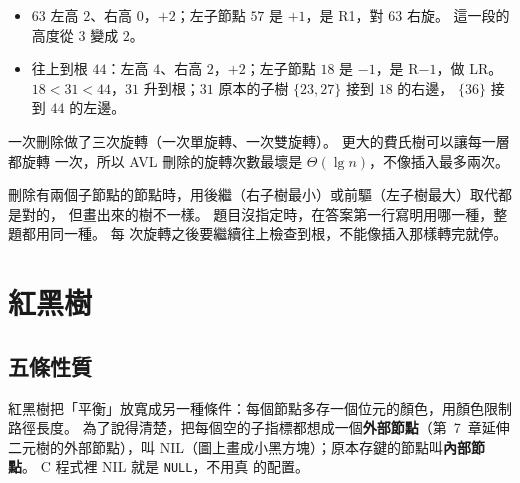 \begin{figure}[htbp]
\label{fig:bal-avl-cascade}
\end{figure}

\begin{itemize}
\item $63$ 左高 $2$、右高 $0$，$+2$；左子節點 $57$ 是 $+1$，是 R1，對 $63$ 右旋。
這一段的高度從 $3$ 變成 $2$。
\item 往上到根 $44$：左高 $4$、右高 $2$，$+2$；左子節點 $18$ 是 $-1$，是 R$-1$，做
LR。 $18 < 31 < 44$，$31$ 升到根；$31$ 原本的子樹 $\{23, 27\}$ 接到 $18$ 的右邊，
$\{36\}$ 接到 $44$ 的左邊。
\end{itemize}

一次刪除做了三次旋轉（一次單旋轉、一次雙旋轉）。 更大的費氏樹可以讓每一層都旋轉
一次，所以 AVL 刪除的旋轉次數最壞是 $\Theta(\lg n)$，不像插入最多兩次。

\begin{examnote}
刪除有兩個子節點的節點時，用後繼（右子樹最小）或前驅（左子樹最大）取代都是對的，
但畫出來的樹不一樣。 題目沒指定時，在答案第一行寫明用哪一種，整題都用同一種。 每
次旋轉之後要繼續往上檢查到根，不能像插入那樣轉完就停。
\end{examnote}

\section{紅黑樹}
\label{sec:bal-rb}

\subsection{五條性質}

紅黑樹把「平衡」放寬成另一種條件：每個節點多存一個位元的顏色，用顏色限制路徑長度。
為了說得清楚，把每個空的子指標都想成一個\textbf{外部節點}（第~7~章延伸二元樹的外部節點），叫
NIL（圖上畫成小黑方塊）；原本存鍵的節點叫\textbf{內部節點}。 C 程式裡 NIL 就是 \texttt{NULL}，不用真
的配置。

